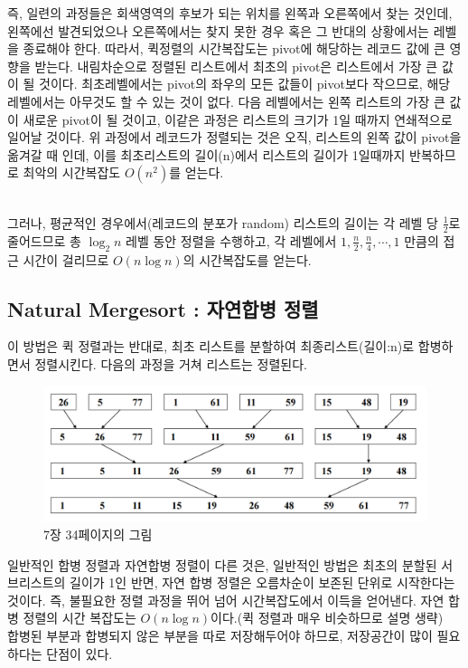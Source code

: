 \documentclass{article}
\begin{document}
즉, 일련의 과정들은 회색영역의 후보가 되는 위치를 왼쪽과 오른쪽에서 찾는 것인데, 왼쪽에선 발견되었으나 오른쪽에서는 찾지 못한 경우 혹은 그 반대의 상황에서는 레벨을 종료해야 한다. 따라서, 퀵정렬의 시간복잡도는 pivot에 해당하는 레코드 값에 큰 영향을 받는다.
\pagebreak
내림차순으로 정렬된 리스트에서 최초의 pivot은 리스트에서 가장 큰 값이 될 것이다. 최초레벨에서는 pivot의 좌우의 모든 값들이 pivot보다 작으므로, 해당 레벨에서는 아무것도 할 수 있는 것이 없다. 다음 레벨에서는 왼쪽 리스트의 가장 큰 값이 새로운 pivot이 될 것이고, 이같은 과정은 리스트의 크기가 1일 때까지 연쇄적으로 일어날 것이다. 위 과정에서 레코드가 정렬되는 것은 오직, 리스트의 왼쪽 값이 pivot을 옮겨갈 때 인데, 이를 최초리스트의 길이(n)에서 리스트의 길이가 1일때까지 반복하므로 최악의 시간복잡도 $O(n^2)$를 얻는다.\\
\\
\par 그러나, 평균적인 경우에서(레코드의 분포가 random) 리스트의 길이는 각 레벨 당 $\frac{1}{2}$로 줄어드므로 총 $\log_2 n$ 레벨 동안 정렬을 수행하고, 각 레벨에서 $1, \frac{n}{2}, \frac{n}{4}, \cdots , 1$ 만큼의 접근 시간이 걸리므로  $O(n\log n)$의 시간복잡도를 얻는다.


\subsection{Natural Mergesort : 자연합병 정렬}
이 방법은 퀵 정렬과는 반대로, 최초 리스트를 분할하여 최종리스트(길이:n)로 합병하면서 정렬시킨다.
다음의 과정을 거쳐 리스트는 정렬된다.\\
\begin{figure}[h]\centering
\includegraphics[width=.9\linewidth]{nmerge.PNG}
\caption*{7장 34페이지의 그림}
\end{figure}
일반적인 합병 정렬과 자연합병 정렬이 다른 것은, 일반적인 방법은 최초의 분할된 서브리스트의 길이가 1인 반면, 자연 합병 정렬은 오름차순이 보존된 단위로 시작한다는 것이다. 즉, 불필요한 정렬 과정을 뛰어 넘어 시간복잡도에서 이득을 얻어낸다.
자연 합병 정렬의 시간 복잡도는 $O(n\log n)$이다.(퀵 정렬과 매우 비슷하므로 설명 생략)\\
합병된 부분과 합병되지 않은 부분을 따로 저장해두어야 하므로, 저장공간이 많이 필요하다는 단점이 있다.
\pagebreak
\end{document}
